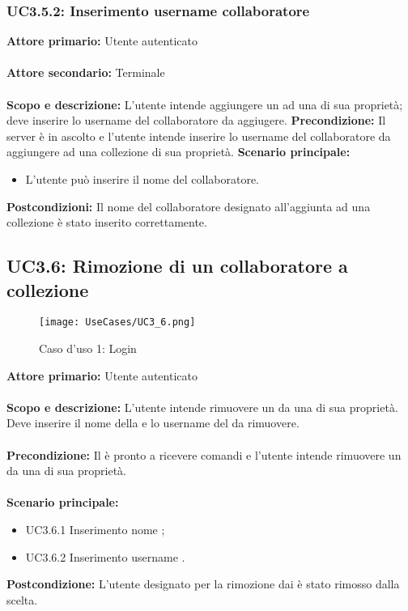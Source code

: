 \documentclass{scalatekids-article}
\begin{document}
\subsubsection{UC3.5.2: Inserimento username collaboratore}

\textbf{Attore primario:} Utente autenticato\\ \\
\textbf{Attore secondario:} Terminale\\ \\
\textbf{Scopo e descrizione:} L'utente intende aggiungere un  ad una  di sua proprietà; deve inserire lo username del collaboratore da aggiugere.
\textbf{Precondizione:} Il server è in ascolto e l'utente intende inserire lo username del collaboratore da aggiungere ad una collezione di sua proprietà.
\textbf{Scenario principale:}
\begin{itemize}
\item L'utente può inserire il nome del collaboratore.
\end{itemize}
\textbf{Postcondizioni:} Il nome del collaboratore designato all'aggiunta ad una collezione è stato inserito correttamente.

\subsection{UC3.6: Rimozione di un collaboratore a collezione}

\begin{figure}[H]
  \begin{center}
    \texttt{[image: UseCases/UC3\_6.png]}
    \caption*{Caso d'uso 1: Login}
  \end{center}
\end{figure}
\textbf{Attore primario:} Utente autenticato\\ \\
\textbf{Scopo e descrizione:} L'utente intende rimuovere un  da una  di sua proprietà. Deve inserire il nome della  e lo username del  da rimuovere.\\ \\
\textbf{Precondizione:} Il  è pronto a ricevere comandi e l'utente intende rimuovere un  da una  di sua proprietà.\\ \\
\textbf{Scenario principale:}
\begin{itemize}
\item UC3.6.1 Inserimento nome ;
\item UC3.6.2 Inserimento username .
\end{itemize}
\textbf{Postcondizione:} L'utente designato per la rimozione dai  è stato rimosso dalla  scelta.
\end{document}
